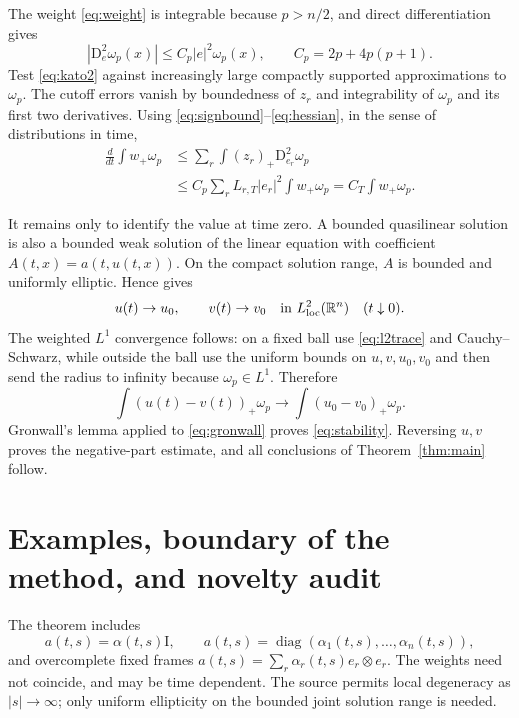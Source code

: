 \documentclass[11pt]{article}
\newcommand{\R}{\mathbb R}
\newcommand{\D}{\mathrm D}
\newcommand{\Id}{\mathrm I}
\begin{document}
The weight \eqref{eq:weight} is integrable because $p>n/2$, and direct
differentiation gives
\begin{equation}\label{eq:hessian}
 |\D_e^2\omega_p(x)|
 \leq C_p|e|^2\omega_p(x),
 \qquad C_p=2p+4p(p+1).
\end{equation}
Test \eqref{eq:kato2} against increasingly large compactly supported
approximations to $\omega_p$.  The cutoff errors vanish by boundedness of
$z_r$ and integrability of $\omega_p$ and its first two derivatives.
Using \eqref{eq:signbound}--\eqref{eq:hessian}, in the sense of
distributions in time,
\begin{align}\label{eq:gronwall}
 \frac{d}{dt}\int w_+\omega_p
 &\leq\sum_r\int (z_r)_+\D_{e_r}^2\omega_p \\
 &\leq C_p\sum_rL_{r,T}|e_r|^2\int w_+\omega_p
 =C_T\int w_+\omega_p.
\end{align}

It remains only to identify the value at time zero.  A bounded quasilinear
solution is also a bounded weak solution of the linear equation with
coefficient $A(t,x)=a(t,u(t,x))$.  On the compact solution range, $A$ is
bounded and uniformly elliptic.  Hence \cite[Proposition 3.4(b)]{AB} gives
\begin{equation}\label{eq:l2trace}
 u(t)\to u_0,\qquad v(t)\to v_0
 \quad\hbox{in }L^2_{\mathrm{loc}}(\R^n)\quad(t\downarrow0).
\end{equation}
The weighted $L^1$ convergence follows: on a fixed ball use
\eqref{eq:l2trace} and Cauchy--Schwarz, while outside the ball use the
uniform bounds on $u,v,u_0,v_0$ and then send the radius to infinity because
$\omega_p\in L^1$.  Therefore
\[
 \int (u(t)-v(t))_+\omega_p
 \longrightarrow\int(u_0-v_0)_+\omega_p.
\]
Gronwall's lemma applied to \eqref{eq:gronwall} proves
\eqref{eq:stability}.  Reversing $u,v$ proves the negative-part estimate,
and all conclusions of Theorem~\ref{thm:main} follow.

\section{Examples, boundary of the method, and novelty audit}

The theorem includes
\[
 a(t,s)=\alpha(t,s)\Id,
 \qquad
 a(t,s)=\operatorname{diag}(\alpha_1(t,s),\ldots,\alpha_n(t,s)),
\]
and overcomplete fixed frames
$a(t,s)=\sum_r\alpha_r(t,s)e_r\otimes e_r$.  The weights need not coincide,
and may be time dependent.  The source permits local degeneracy as
$|s|\to\infty$; only uniform ellipticity on the bounded joint solution range
is needed.
\end{document}
